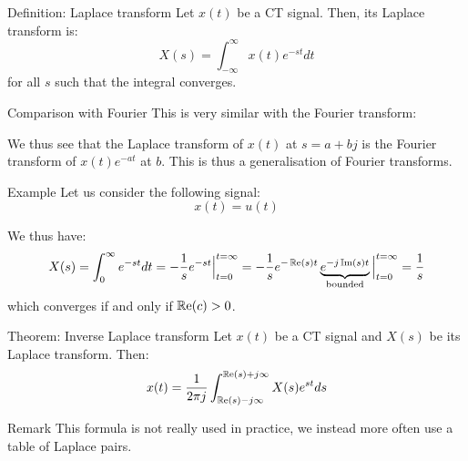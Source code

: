\documentclass[a4paper]{article}
\begin{document}
\begin{parag}{Definition: Laplace transform}
    Let $x\left(t\right)$ be a CT signal. Then, its Laplace transform is: 
    \[X\left(s\right) = \int_{-\infty}^{\infty} x\left(t\right) e^{-s t}dt\]
    for all $s$ such that the integral converges.

    \begin{subparag}{Comparison with Fourier}
        This is very similar with the Fourier transform: 
         
        We thus see that the Laplace transform of $x\left(t\right)$ at $s = a + bj$ is the Fourier transform of $x\left(t\right)e^{-at}$ at $b$. This is thus a generalisation of Fourier transforms.
    \end{subparag}
\end{parag}

\begin{parag}{Example}
    Let us consider the following signal: 
    \[x\left(t\right) = u\left(t\right)\]
    
    We thus have: 
    \[X\left(s\right) = \int_{0}^{\infty} e^{-s t} dt = -\frac{1}{s} e^{-s t} \eval_{t=0}^{t=\infty} = -\frac{1}{s} e^{-\cre\left(s\right)t} \underbrace{e^{-j \cim\left(s\right)t}}_{\text{bounded}} \eval_{t=0}^{t=\infty} = \frac{1}{s}\]
    which converges if and only if $\cre\left(c\right) > 0$.
\end{parag}

\begin{parag}{Theorem: Inverse Laplace transform}
    Let $x\left(t\right)$ be a CT signal and $X\left(s\right)$ be its Laplace transform. Then: 
    \[x\left(t\right) = \frac{1}{2\pi j} \int_{\cre\left(s\right) - j\infty}^{\cre\left(s\right) + j\infty} X\left(s\right) e^{s t}ds\]
    
    \begin{subparag}{Remark}
        This formula is not really used in practice, we instead more often use a table of Laplace pairs.
    \end{subparag}
\end{parag}
\end{document}
